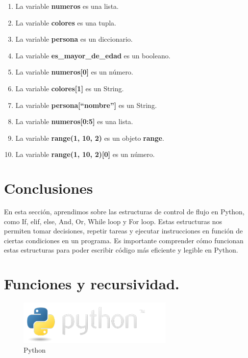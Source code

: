 \documentclass[
  a4paper,
  DIV=11,
  numbers=noendperiod,
  onepage,
  openany]{scrreprt}
\begin{document}
\begin{enumerate}
\def\labelenumi{\arabic{enumi}.}
\item
  La variable \textbf{numeros} es una lista.
\item
  La variable \textbf{colores} es una tupla.
\item
  La variable \textbf{persona} es un diccionario.
\item
  La variable \textbf{es\_mayor\_de\_edad} es un booleano.
\item
  La variable \textbf{numeros{[}0{]}} es un número.
\item
  La variable \textbf{colores{[}1{]}} es un String.
\item
  La variable \textbf{persona{[}``nombre''{]}} es un String.
\item
  La variable \textbf{numeros{[}0:5{]}} es una lista.
\item
  La variable \textbf{range(1, 10, 2)} es un objeto \textbf{range}.
\item
  La variable \textbf{range(1, 10, 2){[}0{]}} es un número.
\end{enumerate}

\chapter{Conclusiones}\label{conclusiones-2}

En esta sección, aprendimos sobre las estructuras de control de flujo en
Python, como If, elif, else, And, Or, While loop y For loop. Estas
estructuras nos permiten tomar decisiones, repetir tareas y ejecutar
instrucciones en función de ciertas condiciones en un programa. Es
importante comprender cómo funcionan estas estructuras para poder
escribir código más eficiente y legible en Python.

\chapter{Funciones y recursividad.}\label{funciones-y-recursividad.}

\begin{figure}[H]

{\centering \includegraphics{index_files/mediabag/python-logo.png}

}

\caption{Python}

\end{figure}%
\end{document}
